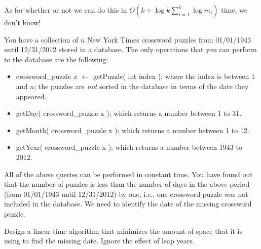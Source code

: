\documentclass{article}
\begin{document}
\begin{enumerate}
As for whether or not we can do this in $O(k+\log k \sum_{i=1}^{k}\log m_{i})$ time, we don't know! \\

\end{enumerate}


 You have a collection of $n$ New York Times
crossword puzzles from 01/01/1943 until 12/31/2012 stored in a
database. The only operations that you can perform to the database are
the following:
\begin{itemize}
\item crossword\_puzzle $x$ $\leftarrow$ getPuzzle( int index ); where the
  index is between $1$ and $n$; the puzzles are \emph{not} sorted in the
  database in terms of the date they appeared.
\item getDay( crossword\_puzzle x ); which returns a number between 1
  to 31.
\item getMonth( crossword\_puzzle x ); which returns a number between
  1 to 12.
\item getYear( crossword\_puzzle x ); which returns a number between
  1943 to 2012.
\end{itemize}
All of the above queries can be performed in constant time. You have
found out that the number of puzzles is less than the number of days
in the above period (from 01/01/1943 until 12/31/2012) by one, i.e.,
one crossword puzzle was not included in the database. We need to
identify the date of the missing crossword puzzle.

Design a linear-time algorithm that minimizes the amount of space that
it is using to find the missing date. Ignore the effect of leap years.\\
\end{document}
